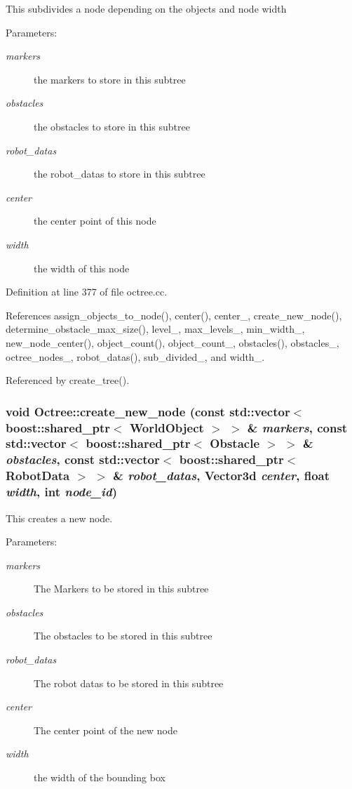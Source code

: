 This subdivides a node depending on the objects and node width

\begin{Desc}
\item[Parameters:]
\begin{description}
\item[{\em markers}]the markers to store in this subtree \item[{\em obstacles}]the obstacles to store in this subtree \item[{\em robot\_\-datas}]the robot\_\-datas to store in this subtree \item[{\em center}]the center point of this node \item[{\em width}]the width of this node \end{description}
\end{Desc}


Definition at line 377 of file octree.cc.

References assign\_\-objects\_\-to\_\-node(), center(), center\_\-, create\_\-new\_\-node(), determine\_\-obstacle\_\-max\_\-size(), level\_\-, max\_\-levels\_\-, min\_\-width\_\-, new\_\-node\_\-center(), object\_\-count(), object\_\-count\_\-, obstacles(), obstacles\_\-, octree\_\-nodes\_\-, robot\_\-datas(), sub\_\-divided\_\-, and width\_\-.

Referenced by create\_\-tree().\hypertarget{class_octree_a40e7b86db10838454cf39b3dc04e762}{
\subsubsection[create\_\-new\_\-node]{\setlength{\rightskip}{0pt plus 5cm}void Octree::create\_\-new\_\-node (const std::vector$<$ boost::shared\_\-ptr$<$ {\bf WorldObject} $>$ $>$ \& {\em markers}, \/  const std::vector$<$ boost::shared\_\-ptr$<$ Obstacle $>$ $>$ \& {\em obstacles}, \/  const std::vector$<$ boost::shared\_\-ptr$<$ {\bf RobotData} $>$ $>$ \& {\em robot\_\-datas}, \/  Vector3d {\em center}, \/  float {\em width}, \/  int {\em node\_\-id})}}
\label{class_octree_a40e7b86db10838454cf39b3dc04e762}


This creates a new node. 

\begin{Desc}
\item[Parameters:]
\begin{description}
\item[{\em markers}]The Markers to be stored in this subtree \item[{\em obstacles}]The obstacles to be stored in this subtree \item[{\em robot\_\-datas}]The robot datas to be stored in this subtree \item[{\em center}]The center point of the new node \item[{\em width}]the width of the bounding box \end{description}
\end{Desc}


